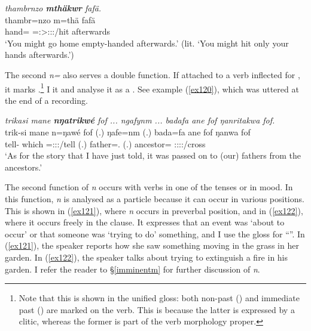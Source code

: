 \begin{exe}
	\ex \emph{thambrnzo \textbf{mthäkwr} fafä.}\\
	\gll thambr=nzo m=thä fafä\\
	hand={\Only} {\Appr}=\Ssg:\Sbj>\Stpl:\Obj:\Imp:\Pfv/hit afterwards\\
	\trans `You might go home empty-handed afterwards.' (lit. `You might hit only your hands afterwards.') 
	\label{ex119}
\end{exe}

The second  \emph{n=} also serves a double function. If attached to a verb inflected for , it marks .\footnote{Note that this is shown in the unified gloss: both non-past (\Nonpast) and immediate past (\Immpst) are marked on the verb. This is because the latter is expressed by a clitic, whereas the former is part of the verb morphology proper.} I  it \Immpst{} and analyse it as a . See example (\ref{ex120}), which was uttered at the end of a recording.

\begin{exe}
	\ex \emph{trikasi mane \textbf{nŋatrikwé} fof ... ngafynm ... badafa ane fof ŋanritakwa fof.}\\
	\gll trik-si mane n=ŋawé fof (.) ŋafe=nm (.) bada=fa ane fof ŋanwa fof\\
	tell-{\Nmlz} which \Immpst=\Fsg:\Sbj:\Nonpast:\Ipfv/tell {\Emph} (.) father={\Dat}.{\Nsg} (.) ancestor={\Abl} {\Dem} {\Emph} \Stsg:\Sbj:\Pst:\Ipfv:\Venit/cross {\Emph}\\
	\trans `As for the story that I have just told, it was passed on to (our) fathers from the ancestors.' 
	\label{ex120}
\end{exe}

The second function of \emph{n} occurs with verbs in one of the  tenses or in  mood. In this function, \emph{n} is analysed as a particle because it can occur in various positions. This is shown in (\ref{ex121}), where \emph{n} occurs in preverbal position, and in (\ref{ex122}), where it occurs freely in the clause. It expresses that an event was `about to occur' or that someone was `trying to do' something, and I use the gloss {\Imn} for ``''.  In (\ref{ex121}), the speaker reports how she saw something moving in the grass in her garden. In (\ref{ex122}), the speaker talks about trying to extinguish a fire in his garden. I refer the reader to {\S}\ref{imminentm} for further discussion of \emph{n}.

